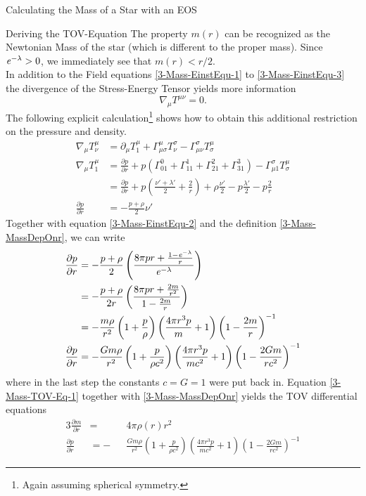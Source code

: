 \begin{section}{Calculating the Mass of a Star with an EOS}
\begin{subsection}{Deriving the TOV-Equation}
The property $m(r)$ can be recognized as the Newtonian Mass of the star (which is different to the proper mass). Since $\mathit{e}^{-\lambda}>0$, we immediately see that $m(r)<r/2$.\\
In addition to the Field equations \ref{3-Mass-EinstEqu-1} to \ref{3-Mass-EinstEqu-3} the divergence of the Stress-Energy Tensor yields more information
\begin{equation}
	\nabla_\mu T^{\mu\nu}=0.
\end{equation}
The following explicit calculation\footnote{Again assuming spherical symmetry.} shows how to obtain this additional restriction on the pressure and density.
\begin{align}
	\nabla_\mu T^\mu_\nu 	&= \partial_\mu T^\mu_1 + \Gamma^\mu_{\mu\sigma}T^\sigma_\nu-\Gamma^\sigma_{\mu\nu}T^\mu_\sigma\\
	\nabla_\mu T^\mu_1		&= \frac{\partial p}{\partial r} + p\left(\Gamma^0_{01}+\Gamma^1_{11}+\Gamma^2_{21}+\Gamma^3_{31} \right) - \Gamma^\sigma_{\mu 1}T^\mu_\sigma\\
							&= \frac{\partial p}{\partial r} + p\left(\frac{\nu'+\lambda'}{2} + \frac{2}{r}\right) + \rho\frac{\nu'}{2} - p\frac{\lambda'}{2} - p\frac{2}{r}\\
	\frac{\partial p}{\partial r} &= -\frac{p+\rho}{2}\nu'
\end{align}
Together with equation \ref{3-Mass-EinstEqu-2} and the definition \ref{3-Mass-MassDepOnr}, we can write
\begin{align}
	\frac{\partial p}{\partial r} 	&= -\frac{p+\rho}{2}\left(\frac{8\pi pr + \frac{1-\mathit{e}^{-\lambda}}{r}}{\mathit{e}^{-\lambda}} \right)\\
									&= -\frac{p+\rho}{2r}\left(\frac{8\pi pr+ \frac{2m}{r^2}}{1-\frac{2m}{r}} \right)\\
									&= -\frac{m\rho}{r^2}\left(1+\frac{p}{\rho}\right)\left(\frac{4\pi r^3p}{m}+1\right)\left(1-\frac{2m}{r}\right)^{-1}\\
	\frac{\partial p}{\partial r} 	&= -\frac{Gm\rho}{r^2}\left(1+\frac{p}{\rho c^2}\right)\left(\frac{4\pi r^3p}{mc^2}+1\right)\left(1-\frac{2Gm}{rc^2}\right)^{-1}
	\label{3-Mass-TOV-Eq-1}
\end{align}
where in the last step the constants $c=G=1$ were put back in. Equation \ref{3-Mass-TOV-Eq-1} together with \ref{3-Mass-MassDepOnr} yields the TOV differential equations
\begin{alignat}{3}
	\frac{\partial m}{\partial r} &= &&4\pi\rho(r)r^2\\
	\frac{\partial p}{\partial r} &= -&&\frac{Gm\rho}{r^2}\left(1+\frac{p}{\rho c^2}\right)\left(\frac{4\pi r^3p}{mc^2}+1\right)\left(1-\frac{2Gm}{rc^2}\right)^{-1}

\end{alignat}
\end{subsection}
\end{section}
